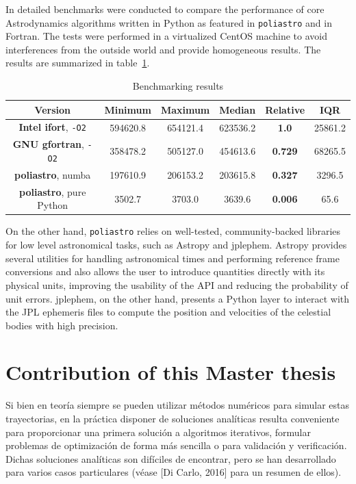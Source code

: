 In \cite{cano2016icatt} detailed benchmarks were conducted to compare the performance of core Astrodynamics algorithms written in Python as featured in \verb|poliastro| and in Fortran. The tests were performed in a virtualized CentOS machine to avoid interferences from the outside world and provide homogeneous results. The results are summarized in table~\ref{table:results}.

\begin{table}
    \centering
    \begin{tabular}{ c|c c c c c }
          \textbf{Version} & \textbf{Minimum} & \textbf{Maximum} & \textbf{Median} & \textbf{Relative} & \textbf{IQR} \\
    \hline
        \textbf{Intel ifort}, \verb|-O2| & 594620.8 & 654121.4 & 623536.2 & \textbf{1.0} & 25861.2 \\ 
        \textbf{GNU gfortran}, \verb|-O2| & 358478.2 & 505127.0 & 454613.6 & \textbf{0.729} & 68265.5 \\ 
        \textbf{poliastro}, numba & 197610.9 & 206153.2 & 203615.8 & \textbf{0.327} & 3296.5 \\ 
        \textbf{poliastro}, pure Python & 3502.7 & 3703.0 & 3639.6 & \textbf{0.006} & 65.6 \\ 
    \end{tabular}
    \caption{Benchmarking results}
    \label{table:results}
\end{table}

On the other hand, \verb|poliastro| relies on well-tested, community-backed libraries for low level astronomical tasks, such as Astropy\cite{robitaille2013astropy} and jplephem. Astropy provides several utilities for handling astronomical times and performing reference frame conversions and also allows the user to introduce quantities directly with its physical units, improving the usability of the API  and reducing the probability of unit errors. jplephem, on the other hand, presents a Python layer to interact with the JPL ephemeris files to compute the position and velocities of the celestial bodies with high precision.

\section{Contribution of this Master thesis} \label{sec:contribution}


Si bien en teoría siempre se pueden utilizar métodos numéricos para simular estas trayectorias, en la práctica disponer de soluciones analíticas resulta conveniente para proporcionar una primera solución a algoritmos iterativos, formular problemas de optimización de forma más sencilla o para validación y verificación. Dichas soluciones analíticas son difíciles de encontrar, pero se han desarrollado para varios casos particulares (véase [Di Carlo, 2016] para un resumen de ellos).

